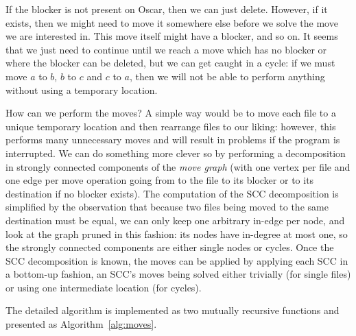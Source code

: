 \documentclass[11pt]{llncs}
\begin{document}
If the blocker is not present on Oscar, then we can just delete. However, if it
exists, then we might need to move it somewhere else before we solve the move we
are interested in. This move itself might have a blocker, and so on. It seems
that we just need to continue until we reach a move which has no blocker or
where the blocker can be deleted, but we can get caught in a cycle: if we must
move $a$ to $b$, $b$ to $c$ and $c$ to $a$, then we will not be able to perform
anything without using a temporary location.

How can we perform the moves? A simple way would be to move each file to a
unique temporary location and then rearrange files to our liking: however, this
performs many unnecessary moves and will result in problems if the program is
interrupted. We can do something more clever so by performing a decomposition in
strongly connected components of the \emph{move graph} (with one vertex per file
and one edge per move operation going from to the file to its blocker or to its
destination if no blocker exists). The computation of the SCC decomposition is
simplified by the observation that because two files being moved to the same
destination must be equal, we can only keep one arbitrary in-edge per node, and
look at the graph pruned in this fashion: its nodes have in-degree at most one,
so the strongly connected components are either single nodes or cycles. Once the
SCC decomposition is known, the moves can be applied by applying each SCC in a
bottom-up fashion, an SCC's moves being solved either trivially (for single
files) or using one intermediate location (for cycles).

The detailed algorithm is implemented as two mutually recursive functions and presented as Algorithm~\ref{alg:moves}.
\end{document}
